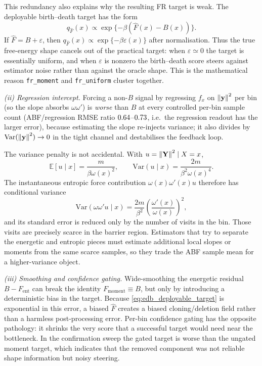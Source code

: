 This redundancy also explains why the resulting FR target is weak. The deployable
birth--death target has the form
\begin{equation}
  q_{\widehat F}(x) \propto
  \exp\{-\beta(\widehat F(x)-B(x))\}.
  \label{eq:edb_deployable_target}
\end{equation}
If $\widehat F=B+\varepsilon$, then
$q_{\widehat F}(x)\propto \exp\{-\beta\varepsilon(x)\}$ after normalisation. Thus
the true free-energy shape cancels out of the practical target: when
$\varepsilon\simeq0$ the target is essentially uniform, and when $\varepsilon$ is
nonzero the birth--death score steers against estimator noise rather than against
the oracle shape. This is the mathematical reason \texttt{fr\_moment} and
\texttt{fr\_uniform} cluster together.

\emph{(ii) Regression intercept.} Forcing a non-$B$ signal by regressing $f_x$ on
$\left\lVert \mathbf y \right\rVert^2$ per bin (so the slope absorbs $\omega\omega'$) is
\emph{worse} than $B$ at every controlled per-bin sample count (ABF/regression
RMSE ratio $0.64$--$0.73$, i.e.\ the regression readout has the larger
error), because estimating the slope re-injects variance; it also divides by
$\mathrm{Var}(\left\lVert \mathbf y \right\rVert^2)\to0$ in the tight channel and destabilises the
feedback loop.

The variance penalty is not accidental. With
$u=\left\lVert \mathbf Y \right\rVert^2\mid X=x$,
\begin{equation}
  \mathbb E[u\mid x]=\frac{m}{\beta\omega(x)^2},\qquad
  \mathrm{Var}(u\mid x)=\frac{2m}{\beta^2\omega(x)^4}.
  \label{eq:edb_u_moments}
\end{equation}
The instantaneous entropic force contribution $\omega(x)\omega'(x)u$ therefore
has conditional variance
\begin{equation}
  \mathrm{Var}\!\left(\omega\omega' u\mid x\right)
  =
  \frac{2m}{\beta^2}\left(\frac{\omega'(x)}{\omega(x)}\right)^2,
  \label{eq:edb_entropic_force_variance}
\end{equation}
and its standard error is reduced only by the number of visits in the bin. Those
visits are precisely scarce in the barrier region. Estimators that try to
separate the energetic and entropic pieces must estimate additional local slopes
or moments from the same scarce samples, so they trade the ABF sample mean for a
higher-variance object.

\emph{(iii) Smoothing and confidence gating.} Wide-smoothing the energetic
residual $B-F_{\mathrm{ent}}$ can break the identity $F_{\mathrm{moment}}\equiv B$,
but only by introducing a deterministic bias in the target. Because
\cref{eq:edb_deployable_target} is exponential in this error, a biased
$\widehat F$ creates a biased cloning/deletion field rather than a harmless
post-processing error. Per-bin confidence gating has the opposite pathology: it
shrinks the very score that a successful target would need near the bottleneck.
In the confirmation sweep the gated target is worse than the ungated moment
target, which indicates that the removed component was not reliable shape
information but noisy steering.


